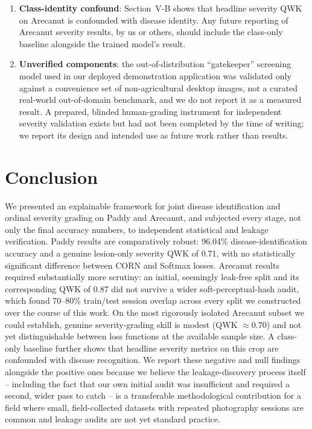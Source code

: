 \documentclass[conference]{IEEEtran}
\begin{document}
\begin{enumerate}
    \item \textbf{Class-identity confound}: Section~V-B shows that headline severity QWK on Arecanut is confounded with disease identity. Any future reporting of Arecanut severity results, by us or others, should include the class-only baseline alongside the trained model's result.
    \item \textbf{Unverified components}: the out-of-distribution ``gatekeeper'' screening model used in our deployed demonstration application was validated only against a convenience set of non-agricultural desktop images, not a curated real-world out-of-domain benchmark, and we do not report it as a measured result. A prepared, blinded human-grading instrument for independent severity validation exists but had not been completed by the time of writing; we report its design and intended use as future work rather than results.
\end{enumerate}

\section{Conclusion}
We presented an explainable framework for joint disease identification and ordinal severity grading on Paddy and Arecanut, and subjected every stage, not only the final accuracy numbers, to independent statistical and leakage verification. Paddy results are comparatively robust: 96.04\% disease-identification accuracy and a genuine lesion-only severity QWK of 0.71, with no statistically significant difference between CORN and Softmax losses. Arecanut results required substantially more scrutiny: an initial, seemingly leak-free split and its corresponding QWK of 0.87 did not survive a wider soft-perceptual-hash audit, which found 70--80\% train/test session overlap across every split we constructed over the course of this work. On the most rigorously isolated Arecanut subset we could establish, genuine severity-grading skill is modest (QWK $\approx 0.70$) and not yet distinguishable between loss functions at the available sample size. A class-only baseline further shows that headline severity metrics on this crop are confounded with disease recognition. We report these negative and null findings alongside the positive ones because we believe the leakage-discovery process itself -- including the fact that our own initial audit was insufficient and required a second, wider pass to catch -- is a transferable methodological contribution for a field where small, field-collected datasets with repeated photography sessions are common and leakage audits are not yet standard practice.
\end{document}
